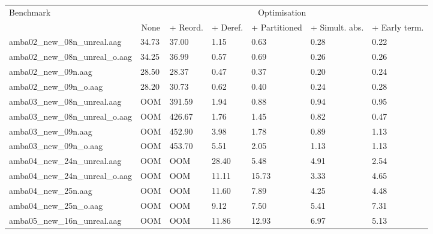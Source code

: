 \begin{sidewaystable}
    \small
    \center
    \begin{tabular}{|l|l|l|l|l|l|l|}
        \hline
        \multirow{2}{*}{Benchmark} & \multicolumn{6}{c|}{Optimisation} \\ \cline{2-7} & 
        \multicolumn{1}{c|}{None}   & \multicolumn{1}{c|}{+ Reord.} & \multicolumn{1}{c|}{+ Deref.} & \multicolumn{1}{c|}{+ Partitioned} & \multicolumn{1}{c|}{+ Simult. abs.} & \multicolumn{1}{c|}{+ Early term.} \\
        \hline
        amba02\_new\_08n\_unreal.aag    & 34.73  & 37.00    & 1.15     & 0.63          & 0.28           & 0.22          \\
        amba02\_new\_08n\_unreal\_o.aag & 34.25  & 36.99    & 0.57     & 0.69          & 0.26           & 0.26          \\
        amba02\_new\_09n.aag            & 28.50  & 28.37    & 0.47     & 0.37          & 0.20           & 0.24          \\
        amba02\_new\_09n\_o.aag         & 28.20  & 30.73    & 0.62     & 0.40          & 0.24           & 0.28          \\
        amba03\_new\_08n\_unreal.aag    & OOM    & 391.59   & 1.94     & 0.88          & 0.94           & 0.95          \\
        amba03\_new\_08n\_unreal\_o.aag & OOM    & 426.67   & 1.76     & 1.45          & 0.82           & 0.47          \\
        amba03\_new\_09n.aag            & OOM    & 452.90   & 3.98     & 1.78          & 0.89           & 1.13          \\
        amba03\_new\_09n\_o.aag         & OOM    & 453.70   & 5.51     & 2.05          & 1.13           & 1.13          \\
        amba04\_new\_24n\_unreal.aag    & OOM    & OOM      & 28.40    & 5.48          & 4.91           & 2.54          \\
        amba04\_new\_24n\_unreal\_o.aag & OOM    & OOM      & 11.11    & 15.73         & 3.33           & 4.65          \\
        amba04\_new\_25n.aag            & OOM    & OOM      & 11.60    & 7.89          & 4.25           & 4.48          \\
        amba04\_new\_25n\_o.aag         & OOM    & OOM      & 9.12     & 7.50          & 5.41           & 7.31          \\
        amba05\_new\_16n\_unreal.aag    & OOM    & OOM      & 11.86    & 12.93         & 6.97           & 5.13          \\

\end{tabular}
\end{sidewaystable}
